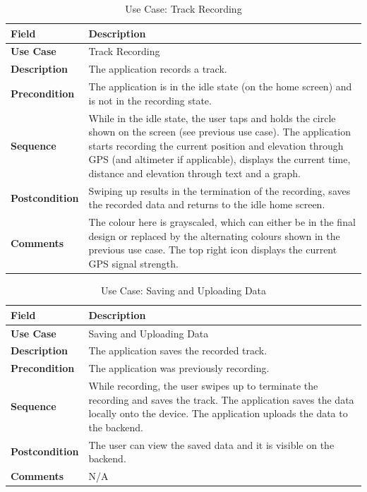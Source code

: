 \documentclass[12pt]{article}
\begin{document}
\begin{table}[h!]
\centering
\begin{tabular}{|p{3cm}|p{11cm}|}
\hline
\textbf{Field} & \textbf{Description} \\
\hline
\textbf{Use Case}   & Track Recording \\
\hline
\textbf{Description} & The application records a track. \\
\hline
\textbf{Precondition} & The application is in the idle state (on the home screen) and is not in the recording state. \\
\hline
\textbf{Sequence} & While in the idle state, the user taps and holds the circle shown on the screen (see previous use case). The application starts recording the current position and elevation through GPS (and altimeter if applicable), displays the current time, distance and elevation through text and a graph. \\
\hline
\textbf{Postcondition} & Swiping up results in the termination of the recording, saves the recorded data and returns to the idle home screen. \\
\hline
\textbf{Comments} & The colour here is grayscaled, which can either be in the final design or replaced by the alternating colours shown in the previous use case. The top right icon displays the current GPS signal strength. \\
\hline
\end{tabular}
\caption{Use Case: Track Recording}
\end{table}

\begin{table}[h!]
\centering
\begin{tabular}{|p{3cm}|p{11cm}|}
\hline
\textbf{Field} & \textbf{Description} \\
\hline
\textbf{Use Case}   & Saving and Uploading Data \\
\hline
\textbf{Description} & The application saves the recorded track. \\
\hline
\textbf{Precondition} & The application was previously recording. \\
\hline
\textbf{Sequence} & While recording, the user swipes up to terminate the recording and saves the track. The application saves the data locally onto the device. The application uploads the data to the backend. \\
\hline
\textbf{Postcondition} & The user can view the saved data and it is visible on the backend. \\
\hline
\textbf{Comments} & N/A \\
\hline
\end{tabular}
\caption{Use Case: Saving and Uploading Data}
\end{table}
\end{document}
